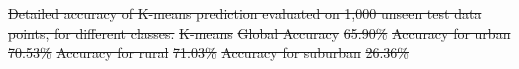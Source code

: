 \documentclass[gmd, manuscript]{copernicus}
\providecommand{\DIFdeltex}[1]{{\protect\color{red}\sout{#1}}}                      %
\providecommand{\DIFdelend}{} %
\providecommand{\DIFdelFL}[1]{\DIFdel{#1}} %
\providecommand{\DIFdel}[1]{\texorpdfstring{\DIFdeltex{#1}}{}} %
\DeclareRobustCommand{\DIFdelend}{\DIFOaddend \let\includegraphics\DIFOincludegraphics} %
\begin{document}
{%
\DIFdelFL{Detailed accuracy of K-means prediction evaluated on 1,000 unseen test data points, for different classes.}}
\DIFdelFL{K-means }%
\DIFdelFL{Global Accuracy       }%
\DIFdelFL{65.90\%  }%
\DIFdelFL{Accuracy for urban    }%
\DIFdelFL{70.53\% }%
\DIFdelFL{Accuracy for rural    }%
\DIFdelFL{71.03\% }%
\DIFdelFL{Accuracy for suburban }%
\DIFdelFL{26.36\% }%
\DIFdelend 
\end{document}
